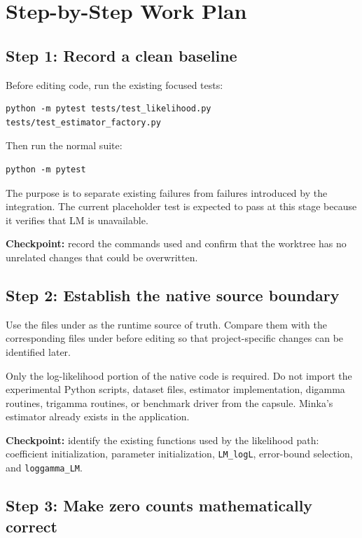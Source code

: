 \documentclass[11pt,a4paper]{article}
\begin{document}
\section{Step-by-Step Work Plan}

\subsection{Step 1: Record a clean baseline}

Before editing code, run the existing focused tests:

\begin{verbatim}
python -m pytest tests/test_likelihood.py tests/test_estimator_factory.py
\end{verbatim}

Then run the normal suite:

\begin{verbatim}
python -m pytest
\end{verbatim}

The purpose is to separate existing failures from failures introduced by the
integration. The current placeholder test is expected to pass at this stage
because it verifies that LM is unavailable.

\textbf{Checkpoint:} record the commands used and confirm that the worktree has
no unrelated changes that could be overwritten.

\subsection{Step 2: Establish the native source boundary}

Use the files under  as the runtime source
of truth. Compare them with the corresponding files under
 before editing so that project-specific changes can be
identified later.

Only the log-likelihood portion of the native code is required. Do not import
the experimental Python scripts, dataset files, estimator implementation,
digamma routines, trigamma routines, or benchmark driver from the capsule.
Minka's estimator already exists in the application.

\textbf{Checkpoint:} identify the existing functions used by the likelihood
path: coefficient initialization, parameter initialization,
\texttt{LM\_logL}, error-bound selection, and \texttt{loggamma\_LM}.

\subsection{Step 3: Make zero counts mathematically correct}
\end{document}
